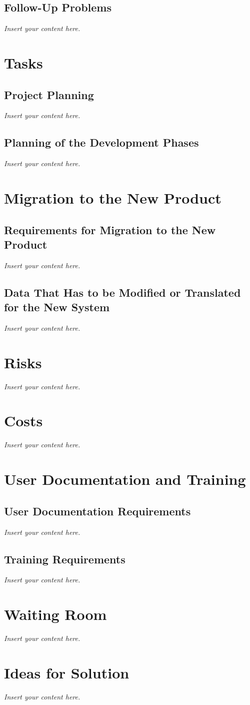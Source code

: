 \documentclass[a4paper, 12pt,twoside]{article}
\newcommand{\lips}{\textit{Insert your content here.}}
\begin{document}
\subsection{Follow-Up Problems}
\lips

\section{Tasks}
\subsection{Project Planning}
\lips
\subsection{Planning of the Development Phases}
\lips

\section{Migration to the New Product}
\subsection{Requirements for Migration to the New Product}
\lips
\subsection{Data That Has to be Modified or Translated for the New System}
\lips

\section{Risks}
\lips
\section{Costs}
\lips
\section{User Documentation and Training}
\subsection{User Documentation Requirements}
\lips
\subsection{Training Requirements}
\lips

\section{Waiting Room}
\lips

\section{Ideas for Solution}
\lips
\end{document}
